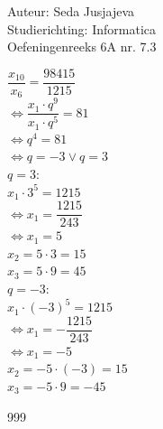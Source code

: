 \documentclass[a4paper]{article}
\begin{document}
\noindent \large Auteur: Seda Jusjajeva\\
\noindent \large Studierichting: Informatica\\
\noindent \large Oefeningenreeks 6A nr. 7.3\\

\medskip

\normalsize



$\dfrac{x_{10}}{x_6} = \dfrac{98415}{1215}$ \\

$\Leftrightarrow \dfrac{x_1\cdot q^9}{x_1\cdot q^5} = 81$ \\

$\Leftrightarrow q^4 = 81$ \\

$\Leftrightarrow q = -3 \vee q = 3$ \\

$q = 3$: \\

$x_1 \cdot 3^5 = 1215$ \\

$\Leftrightarrow x_1 = \dfrac{1215}{243}$ \\

$\Leftrightarrow x_1 = 5$ \\

$x_2 = 5\cdot 3 = 15$ \\

$x_3 = 5\cdot 9 = 45$ \\

$q = -3$: \\

$x_1 \cdot (-3)^5 = 1215$ \\

$\Leftrightarrow x_1 = -\dfrac{1215}{243}$ \\

$\Leftrightarrow x_1 = -5$ \\

$x_2 = -5\cdot (-3) = 15$ \\

$x_3 = -5\cdot 9 = -45$ \\





\begin{thebibliography}{999}
\end{thebibliography}
\end{document}
